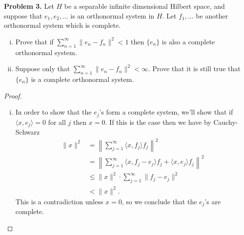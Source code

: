 \documentclass[11pt,letterpaper]{report}
\begin{document}
\noindent\textbf{Problem 3. }
Let $H$ be a separable infinite dimensional Hilbert space, and suppose that $e_1, e_2, \ldots$ is an orthonormal system in $H$. Let $f_1, \ldots$ be another orthonormal system which is complete.
\begin{enumerate}[(i)]
	\item Prove that if $\sum_{n=1}^\infty \|e_n-f_n\|^2<1$ then $\{e_n\}$ is also a complete orthonormal system.
	\item Suppose only that $\sum_{n=1}^\infty \|e_n-f_n\|^2<\infty$. Prove that it is still true that $\{e_n\}$ is a complete orthonormal system.
\end{enumerate}
\begin{proof}
	\begin{enumerate}[(i)]
		\item In order to show that the $e_j$'s form a complete system, we'll show that if $\langle x, e_j\rangle =0 $ for all $j$ then $x = 0$. If this is the case then we have by Cauchy-Schwarz
		\begin{align*}
			\|x\|^2 &= \left\|\sum_{j=1}^\infty \langle x, f_j\rangle f_j\right\|^2\\
			&= \left\|\sum_{j=1}^\infty \langle x, f_j-e_j\rangle f_j + \langle x, e_j\rangle f_j\right\|^2\\
			&\leq \|x\|^2 \cdot \sum_{j=1}^\infty \|f_j-e_j\|^2\\
			&<\|x\|^2.
		\end{align*}
		This is a contradiction unless $x = 0$, so we conclude that the $e_j$'s are complete.


\end{enumerate}
\end{proof}
\end{document}
